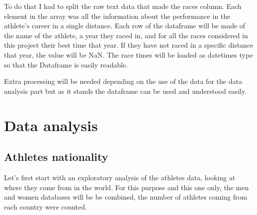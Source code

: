 \documentclass[10pt, a4paper]{article}
\begin{document}
To do that I had to split the raw text data that made the races column. Each element in the array was all the information about the performance in the athlete's career in a single distance. Each row of the dataframe will be made of the name of the athlete, a year they raced in, and for all the races considered in this project their best time that year. If they have not raced in a specific distance that year, the value will be NaN. The race times will be loaded as datetimes type so that the Dataframe is easily readable.

Extra processing will be needed depending on the use of the data for the data analysis part but as it stands the dataframe can be used and understood easily.


\newpage

\section{Data analysis}

\subsection{Athletes nationality}

Let's first start with an exploratory analysis of the athletes data, looking at where they come from in the world. For this purpose and this one only, the men and women databases will be be combined, the number of athletes coming from each country were counted. 
\end{document}
